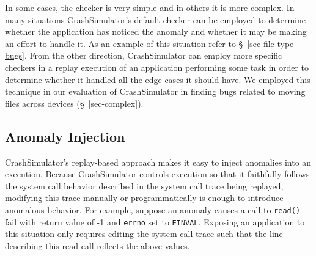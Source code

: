 
    In some cases, %
    the checker is very simple and in others it is more complex.
   In many situations
    CrashSimulator's default checker can be employed to determine
    whether the application has noticed the anomaly and whether it may be making
    an effort to handle it.  As an example of this situation refer to
    \S~\ref{sec-file-type-bugs}.  From the other direction,
    CrashSimulator can employ more specific checkers in a replay execution of an
    application performing some task in order to determine whether it handled
    all the edge cases it should have.  We employed this technique in our
    evaluation of CrashSimulator in finding bugs related to moving files across
    devices (\S~\ref{sec-complex}).
    
    \subsection{Anomaly Injection}

    CrashSimulator's replay-based approach makes it easy to inject anomalies
    into an execution.  
    Because CrashSimulator controls execution so that it faithfully
    follows the system call behavior described in the system call trace being
    replayed, modifying this trace manually or programmatically is enough to
    introduce anomalous behavior.  For example, suppose an anomaly causes a
    call to {\tt read()} fail with return value of -1 and {\tt errno} set to
    {\tt EINVAL}.  Exposing an application to this situation only requires
    editing the system call trace such that the line describing this read call
    reflects the above values.


